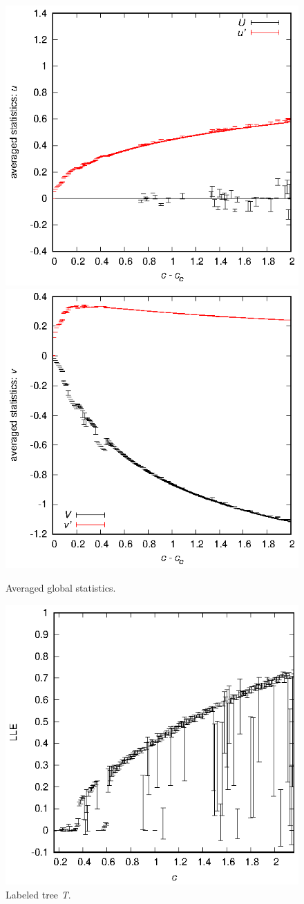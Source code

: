 \documentclass{ws-ijbc}
\begin{document}
\begin{figure}[htbp]
\begin{center}
\includegraphics[width=0.475\linewidth]{stats_u.eps}
\includegraphics[width=0.475\linewidth]{stats_v.eps}
\end{center}
\caption{Averaged global statistics.}
\label{fig.stats}
\end{figure}


\begin{figure}[htbp]
\begin{center}
\includegraphics[width=0.5\linewidth]{lle.eps}
\end{center}
\caption{Labeled tree {\it T}.}
\label{fig.lle}
\end{figure}
\end{document}
